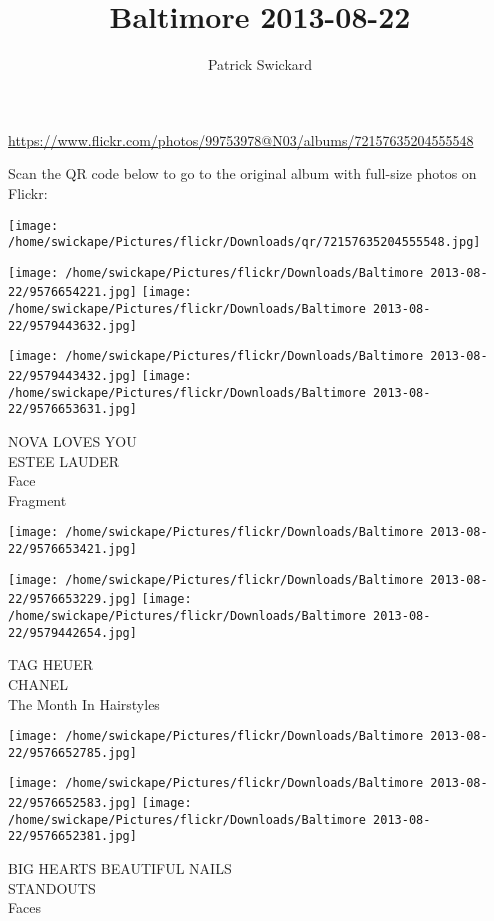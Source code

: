 \documentclass[10pt,letterpaper]{article}
\title{Baltimore 2013-08-22}
\author{Patrick Swickard}
\date{}
\begin{document}
\maketitle

\url{https://www.flickr.com/photos/99753978@N03/albums/72157635204555548}

Scan the QR code below to go to the original album with full-size photos on Flickr:

\texttt{[image: /home/swickape/Pictures/flickr/Downloads/qr/72157635204555548.jpg]}
\pagebreak

\texttt{[image: /home/swickape/Pictures/flickr/Downloads/Baltimore 2013-08-22/9576654221.jpg]}
\texttt{[image: /home/swickape/Pictures/flickr/Downloads/Baltimore 2013-08-22/9579443632.jpg]}

\texttt{[image: /home/swickape/Pictures/flickr/Downloads/Baltimore 2013-08-22/9579443432.jpg]}
\texttt{[image: /home/swickape/Pictures/flickr/Downloads/Baltimore 2013-08-22/9576653631.jpg]}

NOVA LOVES YOU\\
ESTEE LAUDER\\
Face\\
Fragment
\pagebreak

\texttt{[image: /home/swickape/Pictures/flickr/Downloads/Baltimore 2013-08-22/9576653421.jpg]}

\vspace{0.25in}
\texttt{[image: /home/swickape/Pictures/flickr/Downloads/Baltimore 2013-08-22/9576653229.jpg]}
\texttt{[image: /home/swickape/Pictures/flickr/Downloads/Baltimore 2013-08-22/9579442654.jpg]}

TAG HEUER\\
CHANEL\\
The Month In Hairstyles
\pagebreak

\texttt{[image: /home/swickape/Pictures/flickr/Downloads/Baltimore 2013-08-22/9576652785.jpg]}

\vspace{0.25in}
\texttt{[image: /home/swickape/Pictures/flickr/Downloads/Baltimore 2013-08-22/9576652583.jpg]}
\texttt{[image: /home/swickape/Pictures/flickr/Downloads/Baltimore 2013-08-22/9576652381.jpg]}

BIG HEARTS BEAUTIFUL NAILS\\
STANDOUTS\\
Faces
\pagebreak
\end{document}
